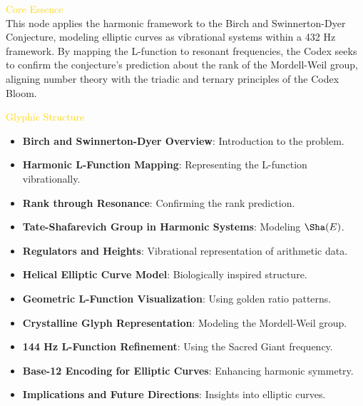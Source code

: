 

\textcolor{gold}{ Core Essence } \\
This node applies the harmonic framework to the Birch and Swinnerton-Dyer Conjecture, modeling elliptic curves as vibrational systems within a 432 Hz framework. By mapping the L-function to resonant frequencies, the Codex seeks to confirm the conjecture’s prediction about the rank of the Mordell-Weil group, aligning number theory with the triadic and ternary principles of the Codex Bloom.

\textcolor{gold}{ Glyphic Structure } \\
\begin{itemize}
    \item \texttt{} \textbf{Birch and Swinnerton-Dyer Overview}: Introduction to the problem.
    \item \texttt{} \textbf{Harmonic L-Function Mapping}: Representing the L-function vibrationally.
    \item \texttt{} \textbf{Rank through Resonance}: Confirming the rank prediction.
    \item \texttt{} \textbf{Tate-Shafarevich Group in Harmonic Systems}: Modeling \(\Sha(E)\).
    \item \texttt{} \textbf{Regulators and Heights}: Vibrational representation of arithmetic data.
    \item \texttt{} \textbf{Helical Elliptic Curve Model}: Biologically inspired structure.
    \item \texttt{} \textbf{Geometric L-Function Visualization}: Using golden ratio patterns.
    \item \texttt{} \textbf{Crystalline Glyph Representation}: Modeling the Mordell-Weil group.
    \item \texttt{} \textbf{144 Hz L-Function Refinement}: Using the Sacred Giant frequency.
    \item \texttt{} \textbf{Base-12 Encoding for Elliptic Curves}: Enhancing harmonic symmetry.
    \item \texttt{} \textbf{Implications and Future Directions}: Insights into elliptic curves.
\end{itemize}

